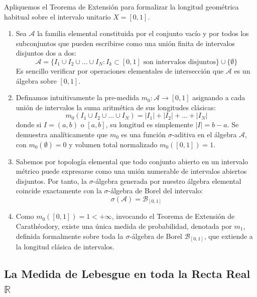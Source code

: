 Apliquemos el Teorema de Extensión para formalizar la longitud geométrica habitual sobre el intervalo unitario $X = [0,1]$.
\begin{enumerate}[1)]
	\item Sea $\mathcal{A}$ la familia elemental constituida por el conjunto vacío y por todos los subconjuntos que pueden escribirse como una unión finita de intervalos disjuntos dos a dos:
	$$ \mathcal{A} = \{ I_1 \cup I_2 \cup \dots \cup I_N : I_k \subset [0,1] \text{ son intervalos disjuntos}\} \cup \{\emptyset\} $$
	Es sencillo verificar por operaciones elementales de intersección que $\mathcal{A}$ es un álgebra sobre $[0,1]$.
	\item Definamos intuitivamente la pre-medida $m_0: \mathcal{A} \to [0,1]$ asignando a cada unión de intervalos la suma aritmética de sus longitudes clásicas:
	$$ m_0(I_1 \cup I_2 \cup \dots \cup I_N) = |I_1| + |I_2| + \dots + |I_N| $$
	donde si $I = (a,b)$ o $[a,b]$, su longitud es simplemente $|I| = b - a$. Se demuestra analíticamente que $m_0$ es una función $\sigma$-aditiva en el álgebra $\mathcal{A}$, con $m_0(\emptyset) = 0$ y volumen total normalizado $m_0([0,1]) = 1$.
	\item Sabemos por topología elemental que todo conjunto abierto en un intervalo métrico puede expresarse como una unión numerable de intervalos abiertos disjuntos. Por tanto, la $\sigma$-álgebra generada por nuestro álgebra elemental coincide exactamente con la $\sigma$-álgebra de Borel del intervalo:
	$$ \sigma(\mathcal{A}) = \mathcal{B}_{[0,1]} $$
	\item Como $m_0([0,1]) = 1 < +\infty$, invocando el Teorema de Extensión de Carathéodory, existe una única medida de probabilidad, denotada por $m_1$, definida formalmente sobre toda la $\sigma$-álgebra de Borel $\mathcal{B}_{[0,1]}$, que extiende a la longitud clásica de intervalos.
\end{enumerate}

\subsection{La Medida de Lebesgue en toda la Recta Real \texorpdfstring{$\mathbb{R}$}{R}}

